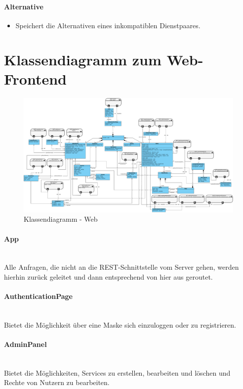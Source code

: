 \paragraph{Alternative} 
\begin{itemize}
	\item Speichert die Alternativen eines inkompatiblen Dienstpaares.
\end{itemize}

\newpage
\section*{Klassendiagramm zum Web-Frontend}

\begin{figure}[!h]
	\centering
	\includegraphics[width=\textwidth]{img/Diagramme/Klassen/Frontend}
	\caption{Klassendiagramm - Web}
	\label{fig:klassendiagramm-web}
\end{figure}

\paragraph{App}\mbox{}\\
Alle Anfragen, die nicht an die REST-Schnittstelle vom Server gehen, werden hierhin zurück geleitet
und dann entsprechend von hier aus geroutet.
\paragraph{AuthenticationPage}\mbox{}\\
Bietet die Möglichkeit über eine Maske sich einzuloggen oder zu registrieren.
\paragraph{AdminPanel}\mbox{}\\
Bietet die Möglichkeiten, Services zu erstellen, bearbeiten und löschen und Rechte von Nutzern zu bearbeiten. 
